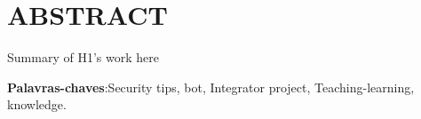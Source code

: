 \noindent\chapter*{\uppercase{Abstract}}

Summary of H1's work here

\vspace{1cm}

\noindent \textbf{Palavras-chaves}:Security tips, bot, Integrator project, Teaching-learning, knowledge.